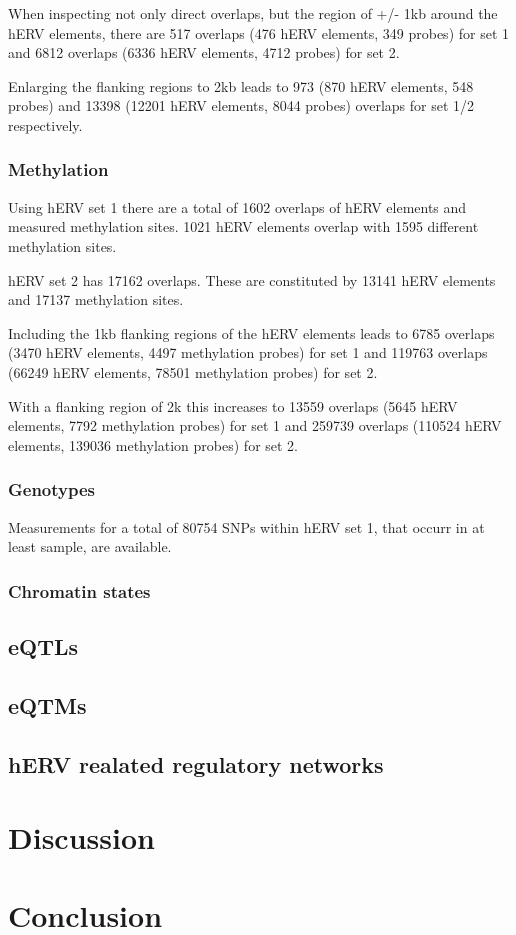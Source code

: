 \documentclass[a4paper,12pt]{article}
\begin{document}
When inspecting not only direct overlaps, but the region of +/- 1kb around the hERV elements, there are 517 overlaps (476 hERV elements, 349 probes) for set 1 and 6812 overlaps (6336 hERV elements, 4712 probes) for set 2.

Enlarging the flanking regions to 2kb leads to 973 (870 hERV elements, 548 probes) and 13398 (12201 hERV elements, 8044 probes) overlaps for set 1/2 respectively.



\subsubsection{Methylation}
Using hERV set 1 there are a total of 1602 overlaps of hERV elements and measured methylation sites. 1021 hERV elements overlap with 1595 different methylation sites.

hERV set 2 has 17162 overlaps. These are constituted by 13141 hERV elements and 17137 methylation sites.

Including the 1kb flanking regions of the hERV elements leads to 6785 overlaps (3470 hERV elements, 4497 methylation probes) for set 1 and 119763 overlaps (66249 hERV elements, 78501 methylation probes) for set 2.

With a flanking region of 2k this increases to 13559 overlaps (5645 hERV elements, 7792 methylation probes) for set 1 and 259739 overlaps (110524 hERV elements, 139036 methylation probes) for set 2. 

\subsubsection{Genotypes}
Measurements for a total of 80754 SNPs within hERV set 1, that occurr in at least  sample, are available.

\subsubsection{Chromatin states}

\subsection{eQTLs}

\subsection{eQTMs}

\subsection{hERV realated regulatory networks}

\newpage
\section{Discussion}

\newpage
\section{Conclusion}

\newpage
{}

\end{document}
